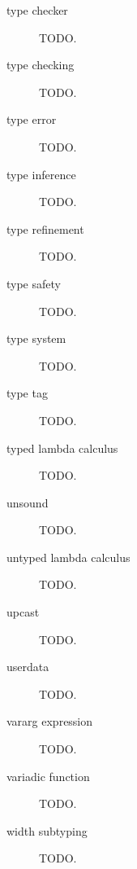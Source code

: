 \begin{description}
\item[type checker] TODO.
\item[type checking] TODO.
\item[type error] TODO.
\item[type inference] TODO.
\item[type refinement] TODO.
\item[type safety] TODO.
\item[type system] TODO.
\item[type tag] TODO.
\item[typed lambda calculus] TODO.
\item[unsound] TODO.
\item[untyped lambda calculus] TODO.
\item[upcast] TODO.
\item[userdata] TODO.
\item[vararg expression] TODO.
\item[variadic function] TODO.
\item[width subtyping] TODO.
\end{description}
